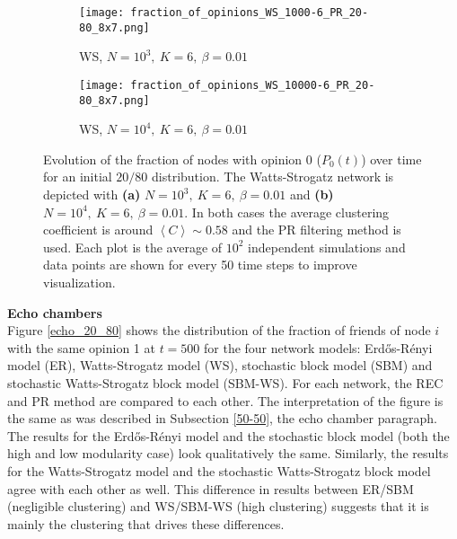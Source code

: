 \documentclass[11 pt , letterpaper , twoside , openright]{book}
\begin{document}
\begin{figure}[H]
  \begin{subfigure}[b]{0.49\textwidth}
  	\texttt{[image: fraction\_of\_opinions\_WS\_1000-6\_PR\_20-80\_8x7.png]}
    \caption{WS, $N = 10^3,\ K=6,\ \beta=0.01$}
    \label{ws1000}
  \end{subfigure}
  \begin{subfigure}[b]{0.49\textwidth}
  	\texttt{[image: fraction\_of\_opinions\_WS\_10000-6\_PR\_20-80\_8x7.png]}
    \caption{WS, $N = 10^4,\ K=6,\ \beta=0.01$}
    \label{ws10000}
  \end{subfigure}
  \captionsetup{format=plain}
  \caption[Evolution of the fraction of nodes with opinion 0 ($P_0(t)$) over time for an initial $20/80$ opinion distribution for a WS model with $N=10^3$ or $N=10^4$, $K=6$ and $\beta = 0.01$, PR]{Evolution of the fraction of nodes with opinion 0 ($P_0(t)$) over time for an initial $20/80$ distribution. The Watts-Strogatz network is depicted with \textbf{(a)} $N=10^3,\ K=6,\ \beta=0.01$ and \textbf{(b)} $N=10^4,\ K=6,\ \beta=0.01$. In both cases the average clustering coefficient is around $\left<C\right> \sim 0.58$ and the PR filtering method is used. Each plot is the average of $10^2$ independent simulations and data points are shown for every 50 time steps to improve visualization.}
\label{ev_op_WS_k=6}
\end{figure}
\noindent
\textbf{Echo chambers}\\
\newline
Figure \ref{echo_20_80} shows the distribution of the fraction of friends of node $i$ with the same opinion 1 at $t=500$ for the four network models: Erd\H{o}s-R\'{e}nyi model (ER), Watts-Strogatz model (WS), stochastic block model (SBM) and stochastic Watts-Strogatz block model (SBM-WS). For each network, the REC and PR method are compared to each other. The interpretation of the figure is the same as was described in Subsection \ref{50-50}, the echo chamber paragraph.\\
\newline
The results for the Erd\H{o}s-R\'{e}nyi model and the stochastic block model (both the high and low modularity case) look qualitatively the same. Similarly, the results for the Watts-Strogatz model and the stochastic Watts-Strogatz block model agree with each other as well. This difference in results between ER/SBM (negligible clustering) and WS/SBM-WS (high clustering) suggests that it is mainly the clustering that drives these differences.\\
\end{document}
